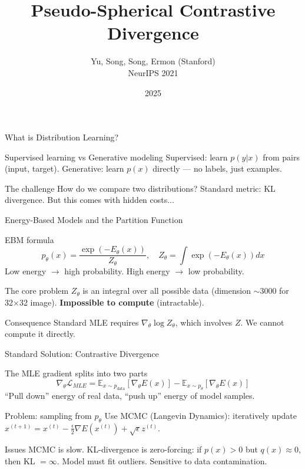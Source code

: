 \documentclass{beamer}
\title{Pseudo-Spherical Contrastive Divergence}
\author{Yu, Song, Song, Ermon (Stanford) \\ NeurIPS 2021}
\institute{Analysis}
\date{2025}
\begin{document}
\begin{frame}[plain]
    \titlepage
\end{frame}

\begin{frame}{What is Distribution Learning?}
\small
\begin{block}{Supervised learning vs Generative modeling}
Supervised: learn $p(y|x)$ from pairs (input, target).
Generative: learn $p(x)$ directly — no labels, just examples.
\end{block}

\begin{block}{The challenge}
How do we compare two distributions? Standard metric: KL divergence.
But this comes with hidden costs...
\end{block}
\end{frame}


\begin{frame}{Energy-Based Models and the Partition Function}
\small
\begin{block}{EBM formula}
$$p_\theta(x) = \frac{\exp(-E_\theta(x))}{Z_\theta}, \quad Z_\theta = \int \exp(-E_\theta(x)) dx$$
Low energy $\to$ high probability. High energy $\to$ low probability.
\end{block}

\begin{block}{The core problem}
$Z_\theta$ is an integral over all possible data (dimension $\sim 3000$ for 32×32 image). 
\textbf{Impossible to compute} (intractable).
\end{block}

\begin{block}{Consequence}
Standard MLE requires $\nabla_\theta \log Z_\theta$, which involves $Z$. We cannot compute it directly.
\end{block}
\end{frame}


\begin{frame}{Standard Solution: Contrastive Divergence}
\small
\begin{block}{The MLE gradient splits into two parts}
$$\nabla_\theta \mathcal{L}_{MLE} = \mathbb{E}_{x \sim p_{\text{data}}}[\nabla_\theta E(x)] - \mathbb{E}_{x \sim p_\theta}[\nabla_\theta E(x)]$$
``Pull down'' energy of real data, ``push up'' energy of model samples.
\end{block}

\begin{block}{Problem: sampling from $p_\theta$}
Use MCMC (Langevin Dynamics): iteratively update $x^{(t+1)} = x^{(t)} - \frac{\epsilon}{2}\nabla E(x^{(t)}) + \sqrt{\epsilon} z^{(t)}$.
\end{block}

\begin{block}{Issues}
MCMC is slow. KL-divergence is zero-forcing: if $p(x) > 0$ but $q(x) \approx 0$, then KL $= \infty$. 
Model must fit outliers. Sensitive to data contamination.
\end{block}
\end{frame}
\end{document}
